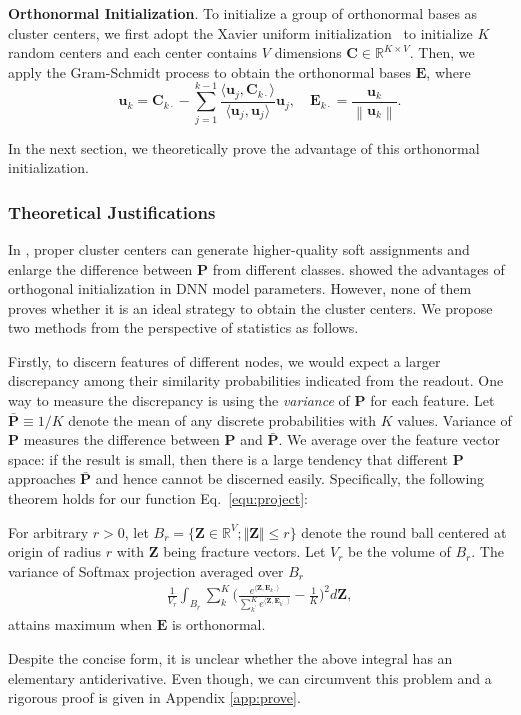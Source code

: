 \textbf{Orthonormal Initialization}. To initialize a group of orthonormal bases as cluster centers, we first adopt the Xavier uniform initialization~\citep{glorot2010understanding} to initialize $K$ random centers and each center contains $V$ dimensions $\bm C\in \mathbb{R}^{K \times V }$. Then, we apply the Gram-Schmidt process to obtain the orthonormal bases $\bm E$, where
\begin{equation}
\label{equ:otho}
\bm u_{k}=\bm C_{k\cdot}-\sum_{j=1}^{k-1} \frac{\langle \bm u_{j}, \bm C_{k\cdot}\rangle }{\langle \bm u_{j},\bm u_{j}\rangle}\bm u_{j}, \quad \bm E_{k\cdot}=\frac{\bm u_{k}}{\left\|\bm u_{k}\right\|}.
\end{equation}

In the next section, we theoretically prove the advantage of this orthonormal initialization.


\subsubsection{Theoretical Justifications} \label{sec:theoretical}

In \poolingshort, proper cluster centers can generate higher-quality soft assignments and enlarge the difference between $\bm P$ from different classes. \citep{Saxe2014ExactST, haitao} showed the advantages of orthogonal initialization in DNN model parameters. However, none of them proves whether it is an ideal strategy to obtain the cluster centers. We propose two methods from the perspective of statistics as follows. 

Firstly, to discern features of different nodes, we would expect a larger discrepancy among their similarity probabilities indicated from the readout. One way to measure the discrepancy is using the \emph{variance} of $\bm P$ for each feature. Let $\bar{\bm P} \equiv 1/K$ denote the mean of any discrete probabilities with $K$ values. Variance of $\bm P$ measures the difference between $\bm P$ and $\bar{\bm P}$. We average over the feature vector space: if the result is small, then there is a large tendency that different $\bm P$ approaches $\bar{\bm P}$ and hence cannot be discerned easily. Specifically, the following theorem holds for our function Eq.~\eqref{equ:project}:
\begin{theorem} \label{Thm3.1}
	For arbitrary $r > 0$, let $B_r = \{\mathcal{\bm Z} \in \mathbb{R}^V; \Vert \mathcal{\bm Z} \Vert \leq r\}$ denote the round ball centered at origin of radius $r$ with $\mathcal{\bm Z}$ being fracture vectors. Let $V_r$ be the volume of $B_r$. The variance of Softmax projection averaged over $B_r$
	\begin{align}
		\frac{1}{V_r} \int_{B_r} \sum_k^K \Big( \frac{e^{\langle \mathcal{\bm Z}, \bm E_{k\cdot}\rangle} }{\sum_{k^{\prime}}^K e^{\langle \mathcal{\bm Z}, \bm E_{k^{\prime}\cdot}\rangle}} - \frac{1}{K} \Big)^2 d \mathcal{\bm Z},
	\end{align}
    attains maximum when $\bm E$ is orthonormal.
\end{theorem}
Despite the concise form, it is unclear whether the above integral has an elementary antiderivative. Even though, we can circumvent this problem and a rigorous proof is given in Appendix \ref{app:prove}.

